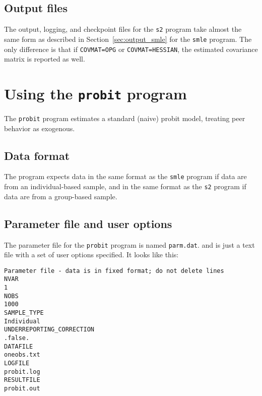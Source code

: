 \documentclass{article}
\begin{document}
\subsection{Output files}

The output, logging, and checkpoint files for the {\tt s2} program
take almost the same form as described in Section~\ref{sec:output_smle} for the {\tt smle} program.
The only difference is that if {\tt COVMAT=OPG} or {\tt COVMAT=HESSIAN}, 
the estimated covariance matrix is reported as well. 

\section{Using the {\tt probit} program}

The {\tt probit} program estimates a standard (naive) probit model, treating
peer behavior as exogenous.

\subsection{Data format}

The program expects data in the same format as the {\tt smle} program
if data are from an individual-based sample, and in the same format 
as the {\tt s2} program if data are from a group-based sample.

\subsection{Parameter file and user options}

The parameter file for the {\tt probit} program is named {\tt parm.dat}.
and is just a text file with a set of user options specified.  It looks like this:
{\scriptsize
\begin{verbatim}
Parameter file - data is in fixed format; do not delete lines
NVAR
1
NOBS
1000
SAMPLE_TYPE
Individual
UNDERREPORTING_CORRECTION
.false.
DATAFILE
oneobs.txt
LOGFILE
probit.log
RESULTFILE
probit.out
\end{verbatim}
}
\end{document}
